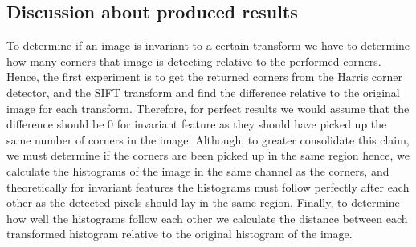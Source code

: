 \documentclass[conference]{IEEEtran}
\begin{document}
\subsection{Discussion about produced results}
To determine if an image is invariant to a certain transform we have to determine how many corners that image is detecting relative to the performed corners. Hence, the first experiment is to get the returned corners from the Harris corner detector, and the SIFT transform and find the difference relative to the original image for each transform. Therefore, for perfect results we would assume that the difference should be 0 for invariant feature as they should have picked up the same number of corners in the image. Although, to greater consolidate this claim, we must determine if the corners are been picked up in the same region hence, we calculate the histograms of the image in the same channel as the corners, and theoretically for invariant features the histograms must follow perfectly after each other as the detected pixels should lay in the same region. Finally, to determine how well the histograms follow each other we calculate the distance between each transformed histogram relative to the original histogram of the image.\par
\end{document}
